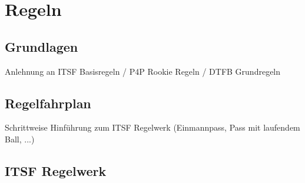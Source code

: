 \chapter{Regeln}

\section{Grundlagen}
Anlehnung an ITSF Basisregeln / P4P Rookie Regeln / DTFB Grundregeln
\section{Regelfahrplan}
Schrittweise Hinführung zum ITSF Regelwerk (Einmannpass, Pass mit laufendem Ball, ...)
\section{ITSF Regelwerk}


